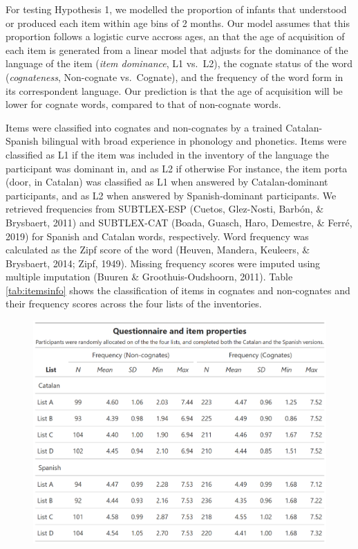 \documentclass[english,man,man,floatsintext]{apa6}
\begin{document}
For testing Hypothesis 1, we modelled the proportion of infants that understood or produced each item within age bins of 2 months. Our model assumes that this proportion follows a logistic curve accross ages, an that the age of acquisition of each item is generated from a linear model that adjusts for the dominance of the language of the item (\emph{item dominance}, L1 vs.~L2), the cognate status of the word (\emph{cognateness}, Non-cognate vs.~Cognate), and the frequency of the word form in its correspondent language. Our prediction is that the age of acquisition will be lower for cognate words, compared to that of non-cognate words.

Items were classified into cognates and non-cognates by a trained Catalan-Spanish bilingual with broad experience in phonology and phonetics. Items were classified as L1 if the item was included in the inventory of the language the participant was dominant in, and as L2 if otherwise For instance, the item porta (door, in Catalan) was classified as L1 when answered by Catalan-dominant participants, and as L2 when answered by Spanish-dominant participants. We retrieved frequencies from SUBTLEX-ESP (Cuetos, Glez-Nosti, Barbón, \& Brysbaert, 2011) and SUBTLEX-CAT (Boada, Guasch, Haro, Demestre, \& Ferré, 2019) for Spanish and Catalan words, respectively. Word frequency was calculated as the Zipf score of the word (Heuven, Mandera, Keuleers, \& Brysbaert, 2014; Zipf, 1949). Missing frequency scores were imputed using multiple imputation (Buuren \& Groothuis-Oudshoorn, 2011). Table \ref{tab:itemsinfo} shows the classification of items in cognates and non-cognates and their frequency scores across the four lists of the inventories.

\begin{figure}

{\centering \includegraphics[width=0.8\linewidth]{trajectories_manuscript_files/figure-latex/itemsinfo-1} 

}

\caption{ }\label{fig:itemsinfo}
\end{figure}
\end{document}
